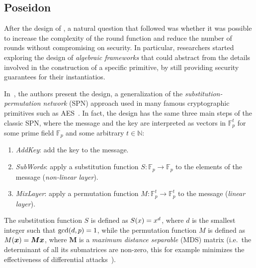 \subsection{Poseidon}
After the design of \Mimc{}, a natural question that followed was whether it was possible to increase
the complexity of the round function and reduce the number of rounds without compromising on 
security.
In particular, researchers started exploring the design of \emph{algebraic frameworks} that could 
abstract from the details involved in the construction of a specific primitive, by still providing 
security guarantees for their instantiatios.

In~\cite{GrassiLRRS2019}, the authors present the \Hades{} design, a generalization
of the \emph{substitution-permutation network} (SPN) approach used in many famous cryptographic 
primitives such as AES~\cite{DaemenR1999}.
In fact, the \Hades{} design has the same three main steps of the classic SPN, where the 
message and the key are interpreted as vectors in \(\mathbb{F}_{p}^t\) for some prime field 
\(\mathbb{F}_p\) and some arbitrary \(t \in \mathbb{N}\):
\begin{enumerate}
  \item \emph{AddKey}: add the key to the message.
  \item \emph{SubWords}: apply a substitution function \(S\colon \mathbb{F}_{p} \to \mathbb{F}_{p}\) 
        to the elements of the message (\emph{non-linear layer}).
  \item \emph{MixLayer}: apply a permutation function \(M\colon \mathbb{F}_{p}^t \to \mathbb{F}_{p}^t\) 
        to the message (\emph{linear layer}).
\end{enumerate}
The substitution function \(S\) is defined as \(\call{S}{x} = x^d\), where \(d\) is the smallest 
integer such that \(\call{\gcd}{d, p} = 1\), while the permutation function \(M\) is defined as 
\(\call{M}{\bm{x}} = \bm{Mx}\), where \(\bm{M}\) is a \emph{maximum distance separable} (MDS) 
matrix (i.e.\ the determinant of all its submatrices are non-zero, this for example minimizes the 
effectiveness of differential attacks~\cite{MacwilliamsS1977,RijmenD1996}).

